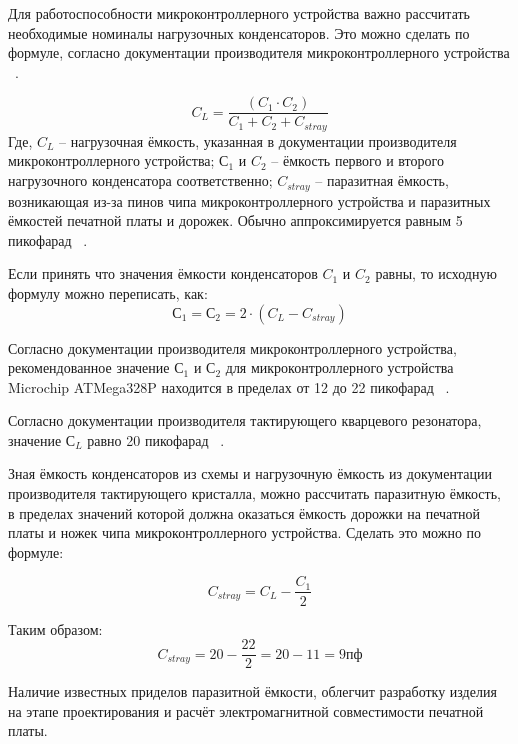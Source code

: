 Для работоспособности микроконтроллерного устройства важно рассчитать
необходимые номиналы нагрузочных конденсаторов. Это можно сделать по
формуле, согласно документации производителя микроконтроллерного
устройства ~\cite{microchip-Calculating-crystal-load-capacitor}.

\begin{equation}
  C_L = \frac{(C_1 \cdot C_2 )}{C_1 + C_2 + C_{stray}}
\end{equation}
Где,
$C_L$ – нагрузочная ёмкость, указанная в документации производителя микроконтроллерного устройства;
$С_1$ и $C_2$ – ёмкость первого и второго нагрузочного конденсатора соответственно;
$C_{stray}$ – паразитная ёмкость, возникающая из-за пинов чипа
микроконтроллерного устройства и паразитных ёмкостей печатной платы и
дорожек. Обычно аппроксимируется равным 5 пикофарад ~\cite{microchip-Calculating-crystal-load-capacitor}.

Если принять что значения ёмкости конденсаторов $C_1$ и $C_2$ равны,
то исходную формулу можно переписать, как:
\begin{equation}
  С_1 = С_2 = 2 \cdot (C_L - C_{stray})
\end{equation}


Согласно документации производителя микроконтроллерного устройства,
рекомендованное значение $С_1$ и $С_2$ для микроконтроллерного
устройства Microchip ATMega328P находится в пределах от 12 до
22 пикофарад ~\cite{microchip-atmega328p-datasheet}.

Согласно документации производителя тактирующего кварцевого резонатора, значение $С_L$ 
равно 20 пикофарад ~\cite{crystal-datasheet}.



Зная ёмкость конденсаторов из схемы и нагрузочную ёмкость из
документации производителя тактирующего кристалла, можно
рассчитать паразитную ёмкость, в пределах значений которой должна
оказаться ёмкость дорожки на печатной платы и ножек чипа
микроконтроллерного устройства. Сделать это можно по формуле:

\begin{equation}
  C_{stray} = C_L - \frac{C_1}{2}
\end{equation}

Таким образом:
$$C_{stray} = 20 - \frac{22}{2} = 20 - 11 = 9пф$$

Наличие известных приделов паразитной ёмкости, облегчит разработку
изделия на этапе проектирования и расчёт электромагнитной
совместимости печатной платы.

\newpage

